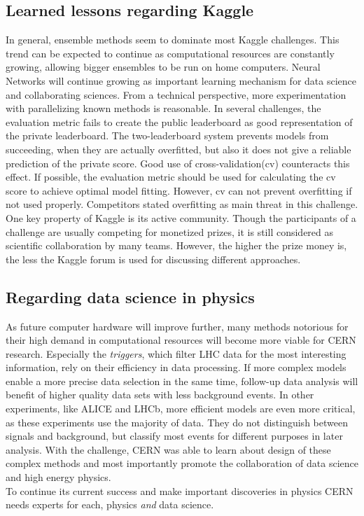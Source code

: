 \subsection{Learned lessons regarding Kaggle}
In general, ensemble methods seem to dominate most Kaggle challenges. This trend can be expected to continue as computational resources are constantly growing, allowing bigger ensembles to be run on home computers. Neural Networks will continue growing as important learning mechanism for data science and collaborating sciences. From a technical perspective, more experimentation with parallelizing known methods is reasonable.
In several challenges, the evaluation metric fails to create the public leaderboard as good representation of the private leaderboard. The two-leaderboard system prevents models from succeeding, when they are actually overfitted, but also it does not give a reliable prediction of the private score. Good use of cross-validation(cv) counteracts this effect. If possible, the evaluation metric should be used for calculating the cv score to achieve optimal model fitting. However, cv can not prevent overfitting if not used properly. Competitors stated overfitting as main threat in this challenge\cite{melis-1st,blog}.
One key property of Kaggle is its active community. Though the participants of a challenge are usually competing for monetized prizes, it is still considered as scientific collaboration by many teams. However, the higher the prize money is, the less the Kaggle forum is used for discussing different approaches.

\subsection{Regarding data science in physics}
As future computer hardware will improve further, many methods notorious for their high demand in computational resources will become more viable for CERN research. Especially the \emph{triggers}, which filter LHC data for the most interesting information, rely on their efficiency in data processing. If more complex models enable a more precise data selection in the same time, follow-up data analysis will benefit of higher quality data sets with less background events.
In other experiments, like ALICE and LHCb, more efficient models are even more critical, as these experiments use the majority of data. They do not distinguish between signals and background, but classify most events for different purposes in later analysis\cite{glig14}. With the challenge, CERN was able to learn about design of these complex methods and most importantly promote the collaboration of data science and high energy physics.\\
To continue its current success and make important discoveries in physics CERN needs experts for each, physics \emph{and} data science.


